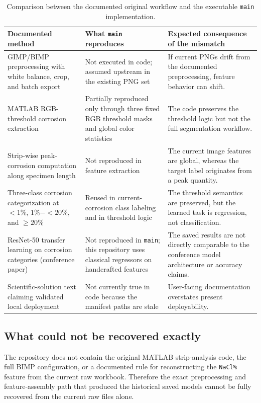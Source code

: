 \documentclass[11pt]{article}
\begin{document}
\begin{table}[H]
\centering
\small
\begin{tabularx}{\textwidth}{p{} p{} Y}
\toprule
\textbf{Documented method} & \textbf{What \texttt{main} reproduces} & \textbf{Expected consequence of the mismatch} \\
\midrule
GIMP/BIMP preprocessing with white balance, crop, and batch export & Not executed in code; assumed upstream in the existing PNG set & If current PNGs drift from the documented preprocessing, feature behavior can shift. \\
MATLAB RGB-threshold corrosion extraction & Partially reproduced only through three fixed RGB threshold masks and global color statistics & The code preserves the threshold logic but not the full segmentation workflow. \\
Strip-wise peak-corrosion computation along specimen length & Not reproduced in feature extraction & The current image features are global, whereas the target label originates from a peak quantity. \\
Three-class corrosion categorization at \(<1\%\), \(1\%-<20\%\), and \(\geq20\%\) & Reused in current-corrosion class labeling and in threshold logic & The threshold semantics are preserved, but the learned task is regression, not classification. \\
ResNet-50 transfer learning on corrosion categories (conference paper) & Not reproduced in \texttt{main}; this repository uses classical regressors on handcrafted features & The saved results are not directly comparable to the conference model architecture or accuracy claims. \\
Scientific-solution text claiming validated local deployment & Not currently true in code because the manifest paths are stale & User-facing documentation overstates present deployability. \\
\bottomrule
\end{tabularx}
\caption{Comparison between the documented original workflow and the executable \texttt{main} implementation.}
\label{tab:traceability}
\end{table}

\subsection{What could not be recovered exactly}
The repository does not contain the original MATLAB strip-analysis code, the full BIMP configuration, or a documented rule for reconstructing the \texttt{NaCl\%} feature from the current raw workbook. Therefore the exact preprocessing and feature-assembly path that produced the historical saved models cannot be fully recovered from the current raw files alone.
\end{document}
